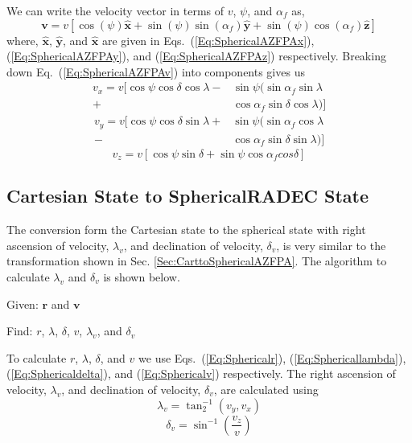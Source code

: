 We can write the velocity vector in terms of $v$, $\psi$, and
$\alpha_f$ as,
%
\begin{equation}
     \mathbf{v} = v\left[\cos( \psi )\hat{\mathbf{x}} + \sin( \psi )\sin(\alpha_f)\hat{\mathbf{y}} +
     \sin( \psi )\cos(\alpha_f)\hat{\mathbf{z}}\right]
     \label{Eq:SphericalAZFPAv}
\end{equation}
%
where, $\hat{\mathbf{x}}$, $\hat{\mathbf{y}}$, and
$\hat{\mathbf{x}}$ are given in Eqs.~(\ref{Eq:SphericalAZFPAx}),
(\ref{Eq:SphericalAZFPAy}), and (\ref{Eq:SphericalAZFPAz})
respectively.  Breaking down Eq.~(\ref{Eq:SphericalAZFPAv}) into
components gives us
%
\begin{equation}
\begin{split}
      v_x = v[ \cos{\psi}\cos{\delta}\cos{\lambda}- &\sin{\psi}(\sin{\alpha_f}\sin{\lambda}
       \\
      +  &\cos{\alpha_f}\sin{\delta}\cos{\lambda})]
\end{split}
\end{equation}
%
\begin{equation}
\begin{split}
      v_y = v[
      \cos{\psi}\cos{\delta}\sin{\lambda}+&\sin{\psi}(\sin{\alpha_f}\cos{\lambda}
      \\
      -&\cos{\alpha_f}\sin{\delta}\sin{\lambda})]
\end{split}
\end{equation}
%
\begin{equation}
      v_z = v[\cos{\psi}\sin{\delta}+\sin{\psi}\cos{\alpha_f}cos{\delta}]
\end{equation}
%

\subsection{Cartesian State to SphericalRADEC State} 

The conversion form the Cartesian state to the spherical state
with right ascension of velocity, $\lambda_v$, and declination of
velocity, $\delta_v$, is very similar to the transformation shown
in Sec. \ref{Sec:CarttoSphericalAZFPA}.  The algorithm to
calculate $\lambda_v$ and $\delta_v$ is shown below.

\noindent Given:  $\mathbf{r}$ and $\mathbf{v}$

\noindent Find:  $r$, $\lambda$, $\delta$, $v$, $\lambda_v$, and
$\delta_v$

To calculate $r$, $\lambda$, $\delta$, and $v$ we use
Eqs.~(\ref{Eq:Sphericalr}), (\ref{Eq:Sphericallambda}),
(\ref{Eq:Sphericaldelta}), and (\ref{Eq:Sphericalv}) respectively.
The right ascension of velocity, $\lambda_v$, and declination of
velocity, $\delta_v$, are calculated using
%
\begin{equation}
    \lambda_v= \tan^{-1}_2(v_y,v_x) \label{Eq:Sphericallambdav}
\end{equation}
%
\begin{equation}
    \delta_v = \sin^{-1}(\frac{v_z}{v}) \label{Eq:Sphericaldeltav}
\end{equation}
%

